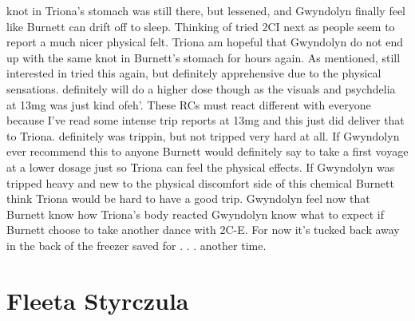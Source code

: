 \documentclass[12pt]{book}
\begin{document}
knot in Triona's stomach was still there, but lessened, and Gwyndolyn finally feel like Burnett can drift off to sleep. Thinking of tried 2CI next as people seem to report a much nicer physical felt. Triona am hopeful that Gwyndolyn do not end up with the same knot in Burnett's stomach for hours again. As mentioned, still interested in tried this again, but definitely apprehensive due to the physical sensations. definitely will do a higher dose though as the visuals and psychdelia at 13mg was just kind ofeh'. These RCs must react different with everyone because I've read some intense trip reports at 13mg and this just did deliver that to Triona. definitely was trippin, but not tripped very hard at all. If Gwyndolyn ever recommend this to anyone Burnett would definitely say to take a first voyage at a lower dosage just so Triona can feel the physical effects. If Gwyndolyn was tripped heavy and new to the physical discomfort side of this chemical Burnett think Triona would be hard to have a good trip. Gwyndolyn feel now that Burnett know how Triona's body reacted Gwyndolyn know what to expect if Burnett choose to take another dance with 2C-E. For now it's tucked back away in the back of the freezer saved for  . . .  another time.






\chapter{Fleeta Styrczula}
\end{document}
